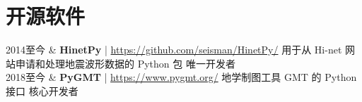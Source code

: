 \section{开源软件}

\begin{EntriesTable}{0.10}{0.02}{0.88}
2014至今 & \textbf{HinetPy} | \url{https://github.com/seisman/HinetPy/} \newline
           用于从 Hi-net 网站申请和处理地震波形数据的 Python 包 \newline
           唯一开发者 \\
2018至今 & \textbf{PyGMT} | \url{https://www.pygmt.org/} \newline
           地学制图工具 GMT 的 Python 接口 \newline
           核心开发者 \\
\end{EntriesTable}
